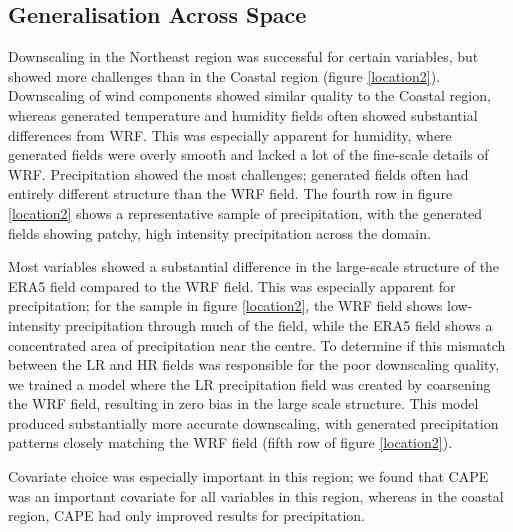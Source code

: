 \documentclass{ametsocV6.1}
\begin{document}
\subsection{Generalisation Across Space}
Downscaling in the Northeast region was successful for certain variables, but showed more challenges than in the Coastal region (figure \ref{location2}). Downscaling of wind components showed similar quality to the Coastal region, whereas generated temperature and humidity fields often showed substantial differences from WRF. This was especially apparent for humidity, where generated fields were overly smooth and lacked a lot of the fine-scale details of WRF. Precipitation showed the most challenges; generated fields often had entirely different structure than the WRF field. The fourth row in figure \ref{location2} shows a representative sample of precipitation, with the generated fields showing patchy, high intensity precipitation across the domain. 

Most variables showed a substantial difference in the large-scale structure of the ERA5 field compared to the WRF field. This was especially apparent for precipitation; for the sample in figure \ref{location2}, the WRF field shows low-intensity precipitation through much of the field, while the ERA5 field shows a concentrated area of precipitation near the centre. To determine if this mismatch between the LR and HR fields was responsible for the poor downscaling quality, we trained a model where the LR precipitation field was created by coarsening the WRF field, resulting in zero bias in the large scale structure. This model produced substantially more accurate downscaling, with generated precipitation patterns closely matching the WRF field (fifth row of figure \ref{location2}).

Covariate choice was especially important in this region; we found that CAPE was an important covariate for all variables in this region, whereas in the coastal region, CAPE had only improved results for precipitation. 
\end{document}
